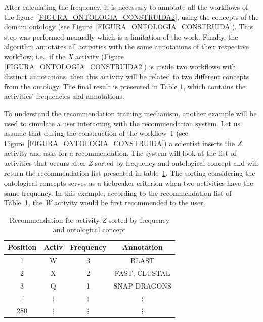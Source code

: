 \documentclass{RITA}
\begin{document}
After calculating the frequency, it is necessary to annotate all the workflows of the figure~\ref{FIGURA_ONTOLOGIA_CONSTRUIDA2}, using the concepts of the domain ontology (see Figure~\ref{FIGURA_ONTOLOGIA_CONSTRUIDA}). This step was performed manually which is a limitation of the work. Finally, the algorithm annotates all activities with the same annotations of their respective workflow; i.e., if the \emph{X} activity (Figure \ref{FIGURA_ONTOLOGIA_CONSTRUIDA2}) is inside two workflows with distinct annotations, then this activity will be related to two different concepts from the ontology. The final result is presented in Table \ref{tabela_lista_recomendacao_ordenada_frequencia}, which contains the activities' frequencies and annotations.

To understand the recommendation training mechanism, another example will be used to simulate a user interacting with the recommendation system. Let us assume that during the construction of the workflow~\(1\) (see Figure~\ref{FIGURA_ONTOLOGIA_CONSTRUIDA}) a scientist inserts the \emph{Z} activity and asks for a recommendation. The system will look at the list of activities that occurs after \emph{Z} sorted by frequency and ontological concept and will return the recommendation list presented in table~\ref{tabela_lista_recomendacao_ordenada_frequencia}. The sorting considering the ontological concepts serves as a tiebreaker criterion when two activities have the same frequency. In this example, according to the recommendation list of Table~\ref{tabela_lista_recomendacao_ordenada_frequencia}, the \emph{W} activity would be first recommended to the user.

\begin{table}[!htb]
	\begin{center}
		\caption{Recommendation for activity \emph{Z} sorted by frequency and ontological concept}
		\label{tabela_lista_recomendacao_ordenada_frequencia}
		\begin{tabular}{cccc} \hline
			\textbf{Position} & \textbf{Activ} & \textbf{Frequency} & \textbf{Annotation} 	\\ \hline
			1				& W 				& 3 				& BLAST				\\ 
			2				& X 				& 2 				& FAST, CLUSTAL		\\ 
			3				& Q 				& 1 				& SNAP DRAGONS		\\ 
			\(\vdots\)		& \(\vdots\)		& \(\vdots\) 		& \(\vdots\)		\\ 
			280				& \(\vdots\)		& \(\vdots\)		& \(\vdots\)	\\ \hline
		\end{tabular}
	\end{center}
\end{table}
\end{document}
